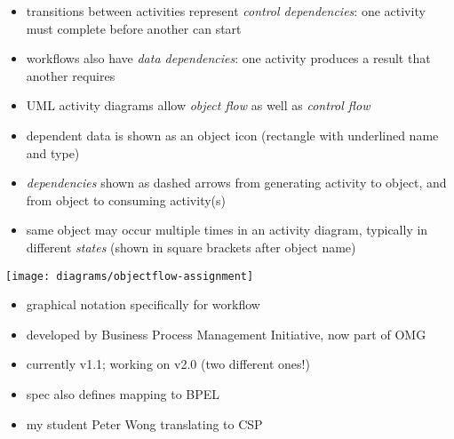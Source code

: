 \documentclass{sepslide-soa-faked} %
\begin{document}
\begin{slide}
\begin{itemize}
\item transitions between activities represent \emph{control dependencies}: one
activity must complete before another can start
\item workflows also have \emph{data dependencies}: one activity produces a
result that another requires
\item UML activity diagrams allow \emph{object flow} as well as
\emph{control flow}
\item dependent data is shown as an object icon 
(rectangle with underlined name and type)
\item \emph{dependencies} shown as dashed arrows from generating activity to
object, and from object to consuming activity(s)
\item same object may occur multiple times in an activity diagram,
  typically in different \emph{states} (shown in square brackets after
  object name)
\end{itemize}
\end{slide}

\begin{slide}

\centerline{\texttt{[image: diagrams/objectflow-assignment]}}
\end{slide}

\begin{slide}
\begin{itemize}
\item graphical notation specifically for workflow
\item developed by Business Process Management Initiative, now part of OMG
\item currently v1.1; working on v2.0 (two different ones!)
\item spec also defines mapping to BPEL
\item my student Peter Wong translating to CSP
\end{itemize}
\end{slide}
\end{document}
